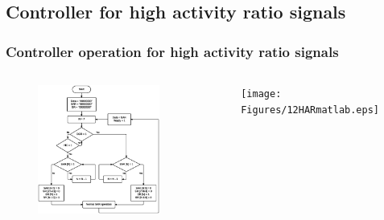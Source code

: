 \documentclass{beamer}
\begin{document}
\subsection*{Controller for high activity ratio signals}
\begin{frame}
	\frametitle{Controller operation for high activity ratio signals } \footnotesize
	\begin{center}
		\begin{columns}[c]
		\column{2.5 in}
			\begin{center}
				\begin{figure}
					\includegraphics[width=6 cm,height=6 cm,angle=360]{Figures/10HARsig.ps}
				\end{figure}
				\scriptsize{ \color{blue}{Controller for high activity ratio signals }}
			\end{center}

		\column{2.5 in}
			\begin{center}
				\begin{figure}
					\texttt{[image: Figures/12HARmatlab.eps]}
				\end{figure}
				\scriptsize{ \color{blue}{Number of clock cycles needed for conversion}}
			\end{center}
		\end{columns}
	\end{center}
\end{frame}
\end{document}
